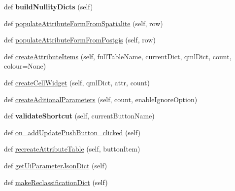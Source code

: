 \begin{DoxyCompactItemize}
def {\bfseries build\+Nullity\+Dicts} (self)
\item 
def \mbox{\hyperlink{class_dsg_tools_1_1_production_tools_1_1_field_tool_box_1_1field__setup_1_1_field_setup_a9c08a3099b5652afb71904d52b9c7d48}{populate\+Attribute\+Form\+From\+Spatialite}} (self, row)
\item 
def \mbox{\hyperlink{class_dsg_tools_1_1_production_tools_1_1_field_tool_box_1_1field__setup_1_1_field_setup_a23cbaa8a07f0b9084a1700358d201a04}{populate\+Attribute\+Form\+From\+Postgis}} (self, row)
\item 
def \mbox{\hyperlink{class_dsg_tools_1_1_production_tools_1_1_field_tool_box_1_1field__setup_1_1_field_setup_a85658685ed7ca0f73f76781de8fde63b}{create\+Attribute\+Items}} (self, full\+Table\+Name, current\+Dict, qml\+Dict, count, colour=None)
\item 
def \mbox{\hyperlink{class_dsg_tools_1_1_production_tools_1_1_field_tool_box_1_1field__setup_1_1_field_setup_aa84f33d5c8b64e1d511cfbda1731e99e}{create\+Cell\+Widget}} (self, qml\+Dict, attr, count)
\item 
def \mbox{\hyperlink{class_dsg_tools_1_1_production_tools_1_1_field_tool_box_1_1field__setup_1_1_field_setup_ab7386e843a6d814917643eb7439388ed}{create\+Aditional\+Parameters}} (self, count, enable\+Ignore\+Option)
\item 
\mbox{\label{class_dsg_tools_1_1_production_tools_1_1_field_tool_box_1_1field__setup_1_1_field_setup_a4d10b1d2c687176519e455580e8eb893}} 
def {\bfseries validate\+Shortcut} (self, current\+Button\+Name)
\item 
def \mbox{\hyperlink{class_dsg_tools_1_1_production_tools_1_1_field_tool_box_1_1field__setup_1_1_field_setup_a389626265ae4295fc97b5ad27cabe6f4}{on\+\_\+add\+Update\+Push\+Button\+\_\+clicked}} (self)
\item 
def \mbox{\hyperlink{class_dsg_tools_1_1_production_tools_1_1_field_tool_box_1_1field__setup_1_1_field_setup_a5e7e4796f0eff36255c4d66ccc268b8d}{recreate\+Attribute\+Table}} (self, button\+Item)
\item 
def \mbox{\hyperlink{class_dsg_tools_1_1_production_tools_1_1_field_tool_box_1_1field__setup_1_1_field_setup_a1f0277a1c21a49371a30311991ea2cdd}{get\+Ui\+Parameter\+Json\+Dict}} (self)
\item 
def \mbox{\hyperlink{class_dsg_tools_1_1_production_tools_1_1_field_tool_box_1_1field__setup_1_1_field_setup_a9de105e60c5ab85740496e84b77d390a}{make\+Reclassification\+Dict}} (self)

\end{DoxyCompactItemize}
